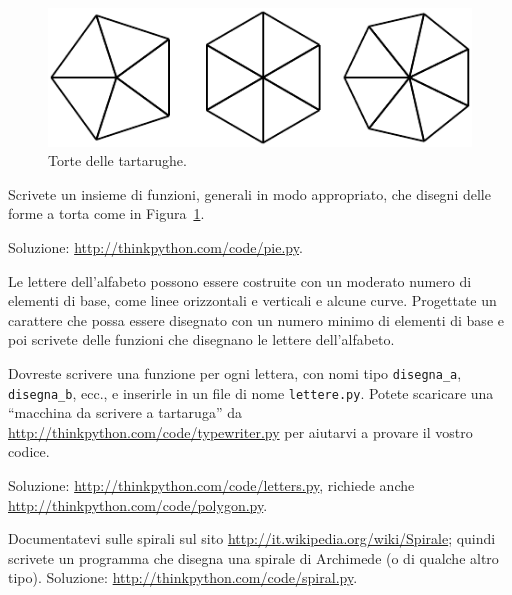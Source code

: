 \documentclass[10pt]{book}
\begin{document}
\begin{figure}
\centerline
{\includegraphics[scale=0.8]{figs/pies.pdf}}
\caption{Torte delle tartarughe.}
\label{fig.pies}
\end{figure}

\vspace{0.2in}
\begin{exercise}

Scrivete un insieme di funzioni, generali in modo appropriato, che disegni delle forme a torta come in Figura~\ref{fig.pies}.

Soluzione: \url{http://thinkpython.com/code/pie.py}.

\end{exercise}

\begin{exercise}

Le lettere dell'alfabeto possono essere costruite con un moderato numero di elementi di base, come linee orizzontali e verticali e alcune curve. Progettate un carattere che possa essere disegnato con un numero minimo di elementi di base e poi scrivete delle funzioni che disegnano le lettere dell'alfabeto.

Dovreste scrivere una funzione per ogni lettera, con nomi tipo
\verb"disegna_a", \verb"disegna_b", ecc., e inserirle in un file di nome {\tt lettere.py}.  Potete scaricare una ``macchina da scrivere a tartaruga'' da \url{http://thinkpython.com/code/typewriter.py}
per aiutarvi a provare il vostro codice.

Soluzione: \url{http://thinkpython.com/code/letters.py}, richiede anche
\url{http://thinkpython.com/code/polygon.py}.

\end{exercise}

\vspace{0.2in}
\begin{exercise}

Documentatevi sulle spirali sul sito \url{http://it.wikipedia.org/wiki/Spirale}; quindi scrivete un programma che disegna una spirale di Archimede (o di qualche altro tipo).  Soluzione: \url{http://thinkpython.com/code/spiral.py}.

\end{exercise}
\end{document}
